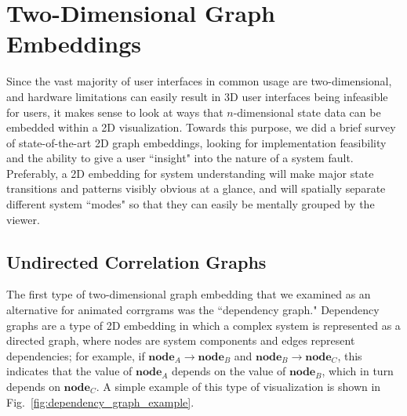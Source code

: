


\section{Two-Dimensional Graph Embeddings}

Since the vast majority of user interfaces in common usage are two-dimensional, and hardware limitations can easily result in 3D user interfaces being infeasible for users, it makes sense to look at ways that $n$-dimensional state data can be embedded within a 2D visualization. Towards this purpose, we did a brief survey of state-of-the-art 2D graph embeddings, looking for implementation feasibility and the ability to give a user ``insight" into the nature of a system fault. Preferably, a 2D embedding for system understanding will make major state transitions and patterns visibly obvious at a glance, and will spatially separate different system ``modes" so that they can easily be mentally grouped by the viewer.

\subsection{Undirected Correlation Graphs}

The first type of two-dimensional graph embedding that we examined as an alternative for animated corrgrams was the ``dependency graph." Dependency graphs are a type of 2D embedding in which a complex system is represented as a directed graph, where nodes are system components and edges represent dependencies; for example, if $\textbf{node}_{A} \rightarrow \textbf{node}_{B}$ and $\textbf{node}_{B} \rightarrow \textbf{node}_{C}$, this indicates that the value of $\textbf{node}_{A}$ depends on the value of $\textbf{node}_{B}$, which in turn depends on $\textbf{node}_{C}$. A simple example of this type of visualization is shown in Fig.~\ref{fig:dependency_graph_example}.

